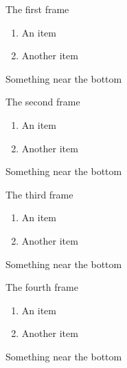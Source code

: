 \documentclass{beamer}
\begin{document}
\begin{frame}{The first frame}
\begin{enumerate}
\item An item
\item Another item
\end{enumerate}
\vfill
Something near the bottom
\end{frame}
\begin{frame}{The second frame}
\begin{enumerate}
\item An item
\item Another item
\end{enumerate}
\vfill
Something near the bottom
\end{frame}
\begin{frame}{The third frame}
\begin{enumerate}
\item An item
\item Another item
\end{enumerate}
\vfill
Something near the bottom
\end{frame}
\begin{frame}{The fourth frame}
\begin{enumerate}
\item An item
\item Another item
\end{enumerate}
\vfill
Something near the bottom
\end{frame}
\end{document}
